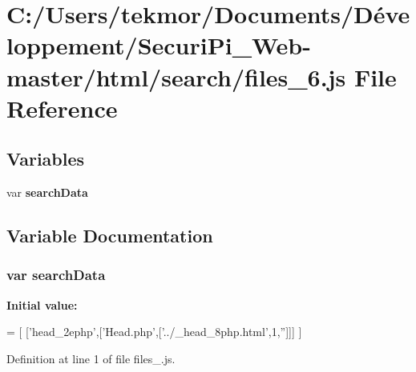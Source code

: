 \section{C\+:/\+Users/tekmor/\+Documents/\+Développement/\+Securi\+Pi\+\_\+\+Web-\/master/html/search/files\+\_\+6.js File Reference}
\label{files__6_8js}
\subsection*{Variables}
\begin{DoxyCompactItemize}
\item 
var {\bf search\+Data}
\end{DoxyCompactItemize}


\subsection{Variable Documentation}
\subsubsection[{search\+Data}]{\setlength{\rightskip}{0pt plus 5cm}var search\+Data}\label{files__6_8js_ad01a7523f103d6242ef9b0451861231e}
{\bfseries Initial value\+:}
\begin{DoxyCode}
=
[
  [\textcolor{stringliteral}{'head\_2ephp'},[\textcolor{stringliteral}{'Head.php'},[\textcolor{stringliteral}{'../\_head\_8php.html'},1,\textcolor{stringliteral}{''}]]]
]
\end{DoxyCode}


Definition at line 1 of file files\+\_.\+js.

